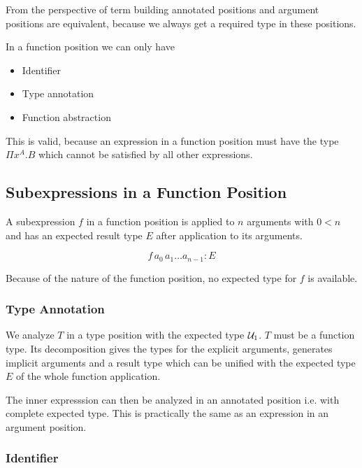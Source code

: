 From the perspective of term building annotated positions and argument
positions are equivalent, because we always get a required type in these
positions.


In a function position we can only have
\begin{itemize}

\item Identifier

\item Type annotation

\item Function abstraction
\end{itemize}

This is valid, because an expression in a function position must have the type
$\Pi x^A.B$ which cannot be satisfied by all other expressions.







\subsection{Subexpressions in a Function Position}

A subexpression $f$ in a function position is applied to $n$ arguments with $0 <
n$ and has an expected result type $E$ after application to its arguments.

$$
    f\, a_0\, a_1 \ldots a_{n-1} : E
$$

Because of the nature of the function position, no expected type for $f$ is
available.


\subsubsection{Type Annotation }

We analyze $T$ in a type position with the expected type ${\cal{U}}_1$. $T$ must be a
function type. Its decomposition gives the types for the explicit arguments,
generates implicit arguments and a result type which can be unified with the
expected type $E$ of the whole function application.

The inner expresssion  can then be analyzed in an annotated position
i.e. with complete expected type. This is practically the same as an expression
in an argument position.

\subsubsection{Identifier}


